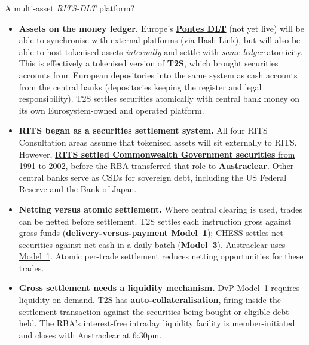 \documentclass[aspectratio=169,12pt]{beamer}
\makeatletter
\newcommand{\rust}[1]{{\color{Rust}\bfseries\fontsize{\dimexpr\f@size pt+0.7pt\relax}{\f@baselineskip}\selectfont #1}}
\newcommand{\footnotedivider}[1]{%
  \AddToShipoutPictureFG*{\AtPageUpperLeft{%
    \put(\LenToUnit{.44cm},\LenToUnit{-#1cm}){%
      \color{neutline}\rule{15.12cm}{.35pt}}}}}
\makeatother
\begin{document}
\begin{frame}[t]{A multi-asset \textit{RITS-DLT} platform?}
\footnotedivider{7.91}
\fontsize{8.0}{10.0}\selectfont
\vspace{-0.1em}
  \vspace{0pt plus 0.35fill}\begin{itemize}\setlength{\itemsep}{2pt plus 2.4fill}
    \item \rust{Assets on the money ledger.} Europe's \href{https://www.ecb.europa.eu/paym/target/pontes/html/index.en.html}{\textbf{Pontes DLT}} (not yet live) will be able to synchronise with external platforms (via Hash Link), but will also be able to host tokenised assets \textit{internally} and settle with \textit{same-ledger} atomicity. This is effectively a tokenised version of \textbf{T2S}, which brought securities accounts from European depositories into the same system as cash accounts from the central banks (depositories keeping the register and legal responsibility). T2S settles securities atomically with central bank money on its own Eurosystem-owned and operated platform.
    \item \rust{RITS began as a securities settlement system.} All four RITS Consultation areas assume that tokenised assets will sit externally to RITS. However, \href{https://www.rba.gov.au/publications/annual-reports/rba/1991/fin-market.html}{\textbf{RITS settled Commonwealth Government securities} from 1991 to 2002}, \href{https://www.rba.gov.au/publications/annual-reports/rba/2002/bus-serv.html}{before the RBA transferred that role to \textbf{Austraclear}}. Other central banks serve as CSDs for sovereign debt, including the US Federal Reserve and the Bank of Japan.
    \item \rust{Netting versus atomic settlement.} Where central clearing is used, trades can be netted before settlement. T2S settles each instruction gross against gross funds (\textbf{delivery-versus-payment Model~1}); CHESS settles net securities against net cash in a daily batch (\textbf{Model~3}). \href{https://www.rba.gov.au/payments-and-infrastructure/financial-market-infrastructure/clearing-and-settlement-facilities/assessments/2018-2019/c2-financial-stability-standards-for-securities-settlement-facilities/standard-10.html}{Austraclear uses Model~1}. Atomic per-trade settlement reduces netting opportunities for these trades.
    \item \rust{Gross settlement needs a liquidity mechanism.} DvP Model~1 requires liquidity on demand. T2S has \textbf{auto-collateralisation}, firing inside the settlement transaction against the securities being bought or eligible debt held. The RBA's interest-free intraday liquidity facility is member-initiated and closes with Austraclear at 6:30pm.

\end{itemize}
\end{frame}
\end{document}
